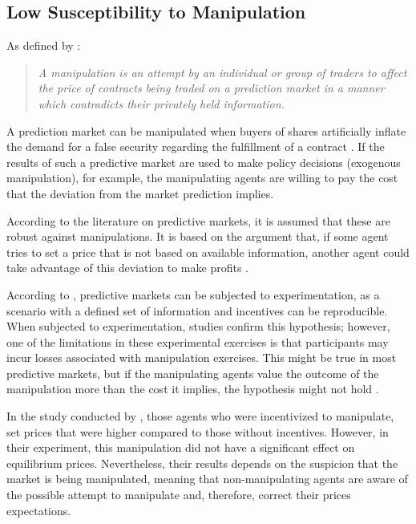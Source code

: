 \subsection{Low Susceptibility to Manipulation}
\label{subsec:low_susceptibility_to_manipulation}

As defined by \cite{buckley2017effect}:
\begin{quote}
    \textit{A manipulation is an attempt by an individual or group of traders to affect the price of contracts being traded on a prediction market in a manner which contradicts their privately held information.}
\end{quote}
    
A prediction market can be manipulated when buyers of shares artificially inflate the demand for a false security regarding the fulfillment of a contract \parencite{choo2022manipulation}. If the results of such a predictive market are used to make policy decisions (exogenous manipulation), for example, the manipulating agents are willing to pay the cost that the deviation from the market prediction implies.
    
According to the literature on predictive markets, it is assumed that these are robust against manipulations. It is based on the argument that, if some agent tries to set a price that is not based on available information, another agent could take advantage of this deviation to make profits \parencite{buckley2017effect}.
    
According to \cite{HANSON2006449}, predictive markets can be subjected to experimentation, as a scenario with a defined set of information and incentives can be reproducible. When subjected to experimentation, studies confirm this hypothesis; however, one of the limitations in these experimental exercises is that participants may incur losses associated with manipulation exercises. This might be true in most predictive markets, but if the manipulating agents value the outcome of the manipulation more than the cost it implies, the hypothesis might not hold \parencite{deck2013affecting}.

In the study conducted by \citeauthor{HANSON2006449}, those agents who were incentivized to manipulate, set prices that were higher compared to those without incentives. However, in their experiment, this manipulation did not have a significant effect on equilibrium prices. Nevertheless, their results depends on the suspicion that the market is being manipulated, meaning that non-manipulating agents are aware of the possible attempt to manipulate and, therefore, correct their prices expectations.
    

